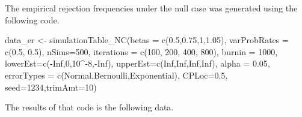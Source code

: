 \documentclass[
]{article}
\newenvironment{Shaded}{\begin{snugshade}}{\end{snugshade}}
\newcommand{\AttributeTok}[1]{\textcolor[rgb]{0.77,0.63,0.00}{#1}}
\newcommand{\ConstantTok}[1]{\textcolor[rgb]{0.00,0.00,0.00}{#1}}
\newcommand{\DecValTok}[1]{\textcolor[rgb]{0.00,0.00,0.81}{#1}}
\newcommand{\FloatTok}[1]{\textcolor[rgb]{0.00,0.00,0.81}{#1}}
\newcommand{\FunctionTok}[1]{\textcolor[rgb]{0.00,0.00,0.00}{#1}}
\newcommand{\NormalTok}[1]{#1}
\newcommand{\OtherTok}[1]{\textcolor[rgb]{0.56,0.35,0.01}{#1}}
\newcommand{\SpecialCharTok}[1]{\textcolor[rgb]{0.00,0.00,0.00}{#1}}
\newcommand{\StringTok}[1]{\textcolor[rgb]{0.31,0.60,0.02}{#1}}
\begin{document}
The empirical rejection frequencies under the null case was generated
using the following code.

\begin{Shaded}
\begin{Highlighting}[]
\NormalTok{data\_er }\OtherTok{\textless{}{-}} \FunctionTok{simulationTable\_NC}\NormalTok{(}\AttributeTok{betas =} \FunctionTok{c}\NormalTok{(}\FloatTok{0.5}\NormalTok{,}\FloatTok{0.75}\NormalTok{,}\DecValTok{1}\NormalTok{,}\FloatTok{1.05}\NormalTok{), }
                              \AttributeTok{varProbRates =} \FunctionTok{c}\NormalTok{(}\FloatTok{0.5}\NormalTok{, }\FloatTok{0.5}\NormalTok{),}
                              \AttributeTok{nSims=}\DecValTok{500}\NormalTok{, }\AttributeTok{iterations =} \FunctionTok{c}\NormalTok{(}\DecValTok{100}\NormalTok{, }\DecValTok{200}\NormalTok{, }\DecValTok{400}\NormalTok{, }\DecValTok{800}\NormalTok{), }
                              \AttributeTok{burnin =} \DecValTok{1000}\NormalTok{, }\AttributeTok{lowerEst=}\FunctionTok{c}\NormalTok{(}\SpecialCharTok{{-}}\ConstantTok{Inf}\NormalTok{,}\DecValTok{0}\NormalTok{,}\DecValTok{10}\SpecialCharTok{\^{}{-}}\DecValTok{8}\NormalTok{,}\SpecialCharTok{{-}}\ConstantTok{Inf}\NormalTok{), }
                              \AttributeTok{upperEst=}\FunctionTok{c}\NormalTok{(}\ConstantTok{Inf}\NormalTok{,}\ConstantTok{Inf}\NormalTok{,}\ConstantTok{Inf}\NormalTok{,}\ConstantTok{Inf}\NormalTok{), }\AttributeTok{alpha =} \FloatTok{0.05}\NormalTok{,}
                              \AttributeTok{errorTypes =} \FunctionTok{c}\NormalTok{(}\StringTok{\textquotesingle{}Normal\textquotesingle{}}\NormalTok{,}\StringTok{\textquotesingle{}Bernoulli\textquotesingle{}}\NormalTok{,}\StringTok{\textquotesingle{}Exponential\textquotesingle{}}\NormalTok{),}
                              \AttributeTok{CPLoc=}\FloatTok{0.5}\NormalTok{, }\AttributeTok{seed=}\DecValTok{1234}\NormalTok{,}\AttributeTok{trimAmt=}\DecValTok{10}\NormalTok{)}
\end{Highlighting}
\end{Shaded}

The results of that code is the following data.
\end{document}
